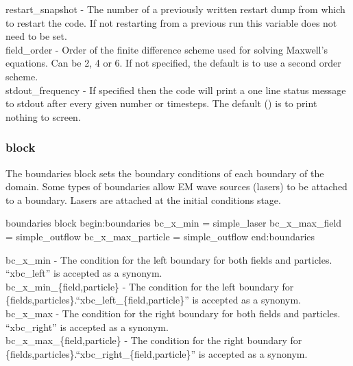 {\emphtext restart\_snapshot} - The number of a previously written restart
dump from which to restart the code. If not restarting from a previous run
this variable does not need to be set.\\

{\emphtext field\_order} - Order of the finite difference scheme used for
solving Maxwell's equations. Can be 2, 4 or 6. If not specified, the default
is to use a second order scheme.\\

{\emphtext stdout\_frequency} - If specified then the code will print a one
line status message to stdout after every given number or timesteps. The
default () is to print nothing to screen.

\subsubsection{ block}
The {\emphtext boundaries} block sets the boundary conditions of each boundary
of the domain. Some types of boundaries allow EM wave sources (lasers) to be
attached to a boundary. Lasers are attached at the initial conditions
stage.

\begin{lboxverbatim}{boundaries block}
begin:boundaries
   bc_x_min = simple_laser
   bc_x_max_field = simple_outflow
   bc_x_max_particle = simple_outflow
end:boundaries
\end{lboxverbatim}

{\emphtext bc\_x\_min} - The condition for the left boundary for both fields
and particles. ``xbc\_left'' is accepted as a synonym.\\

{\emphtext bc\_x\_min\_\{field,particle\}} - The condition for the left
boundary for \{fields,particles\}.\linebreak ``xbc\_left\_\{field,particle\}''
is accepted as a synonym.\\

{\emphtext bc\_x\_max} - The condition for the right boundary for both fields
and particles. ``xbc\_right'' is accepted as a synonym.\\

{\emphtext bc\_x\_max\_\{field,particle\}} - The condition for the right
boundary for \{fields,particles\}.\linebreak ``xbc\_right\_\{field,particle\}''
is accepted as a synonym.\\


